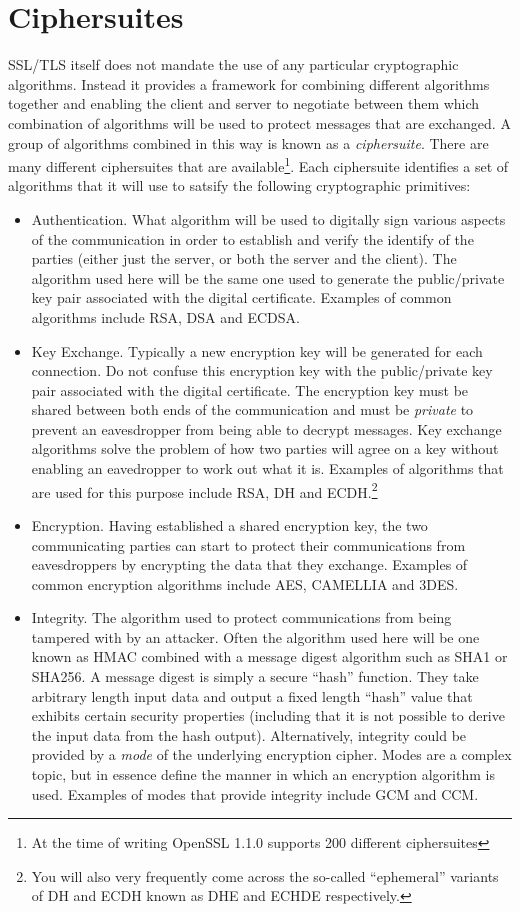 \section{Ciphersuites}

SSL/TLS itself does not mandate the use of any particular cryptographic 
algorithms. Instead it provides a framework for combining different algorithms 
together and enabling the client and server to negotiate between them which 
combination of algorithms will be used to protect messages that are exchanged. 
A group of algorithms combined in this way is known as a \emph{ciphersuite}. 
There are many different ciphersuites that are available\footnote{At the time 
of writing OpenSSL 1.1.0 supports 200 different ciphersuites}. Each 
ciphersuite identifies a set of algorithms that it will use to satsify the 
following cryptographic primitives:
\begin{itemize}
\item Authentication. What algorithm will be used to digitally sign various 
aspects of the communication in order to establish and verify the identify of
the parties (either just the server, or both the server and the client). The 
algorithm used here will be the same one used to generate the public/private 
key pair associated with the digital certificate. Examples of common algorithms 
include RSA, DSA and ECDSA.
\item Key Exchange. Typically a new encryption key will be generated for each
connection. Do not confuse this encryption key with the public/private key pair
associated with the digital certificate. The encryption key must be shared
between both ends of the communication and must be \emph{private} to prevent an
eavesdropper from being able to decrypt messages. Key exchange algorithms solve 
the problem of how two parties will agree on a key without enabling an 
eavedropper to work out what it is. Examples of algorithms that are used for 
this purpose include RSA, DH and ECDH.\footnote{You will also very frequently 
come across the so-called ``ephemeral'' variants of DH and ECDH known as DHE 
and ECHDE respectively.}
\item Encryption. Having established a shared encryption key, the two 
communicating parties can start to protect their communications from 
eavesdroppers by encrypting the data that they exchange. Examples of common 
encryption algorithms include AES, CAMELLIA and 3DES.
\item Integrity. The algorithm used to protect communications from being 
tampered with by an attacker. Often the algorithm used here will be one known 
as HMAC combined with a message digest algorithm such as SHA1 or SHA256. A 
message digest is simply a secure ``hash'' function. They take arbitrary 
length input data and output a fixed length ``hash'' value that exhibits 
certain security properties (including that it is not possible to derive the 
input data from the hash output). Alternatively, integrity could be provided by
a \emph{mode} of the underlying  encryption cipher. Modes are a complex topic,
but in essence define the manner in which an encryption algorithm is used.
Examples of modes that provide integrity include GCM and CCM.
\end{itemize}

